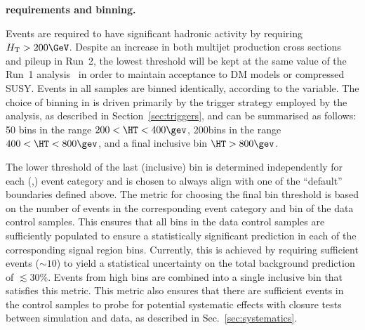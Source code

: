 {\bf \HT requirements and binning.} 

Events are required to have significant hadronic activity by requiring
$\scalht > 200\GeV$. Despite an increase in both multijet production
cross sections and pileup in Run~2, the lowest \HT threshold will be
kept at the same value of the Run~1 analysis~\cite{Chatrchyan:2013lya}
in order to maintain acceptance to DM models or compressed
SUSY. Events in all samples are binned identically, according to the
\HT variable. The choice of binning in \HT is driven primarily by the
trigger strategy employed by the analysis, as described in
Section~\ref{sec:triggers}, and can be summarised as follows: 50\gev
bins in the range $200 < \HT < 400\gev$, 200\gev bins in the range
$400 < \HT < 800\gev$, and a final inclusive bin $\HT > 800\gev$.

The lower threshold of the last (inclusive) \HT bin is determined
independently for each (\njet,\nb) event category and is chosen to
always align with one of the ``default'' boundaries defined above. The
metric for choosing the final bin threshold is based on the number of
events in the corresponding event category and \HT bin of the data
control samples. This ensures that all bins in the data control
samples are sufficiently populated to ensure a statistically
significant prediction in each of the corresponding signal region
bins. Currently, this is achieved by requiring sufficient events
($\sim 10$) to yield a statistical uncertainty on the total background
prediction of $\lesssim30\%$. Events from high \HT bins are combined
into a single inclusive bin that satisfies this metric. This metric
also ensures that there are sufficient events in the control samples
to probe for potential systematic effects with closure tests between
simulation and data, as described in Sec.~\ref{sec:systematics}.

